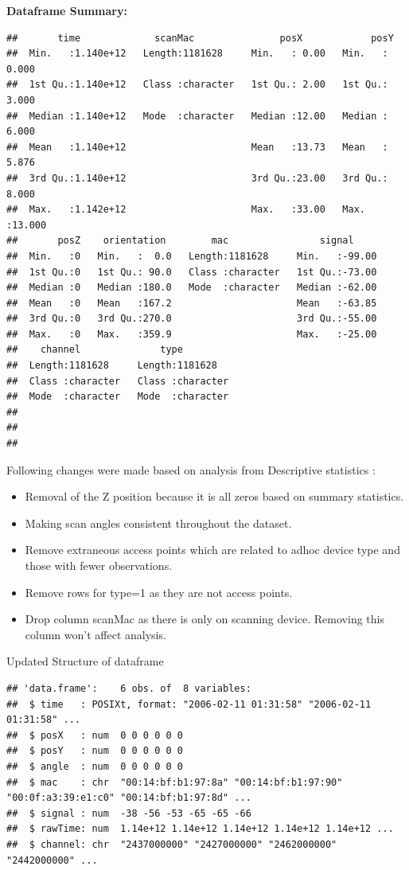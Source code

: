 \documentclass[
]{article}
\providecommand{\tightlist}{%
  \setlength{\itemsep}{0pt}\setlength{\parskip}{0pt}}
\begin{document}
\textbf{Dataframe Summary:}

\begin{verbatim}
##       time             scanMac               posX            posY       
##  Min.   :1.140e+12   Length:1181628     Min.   : 0.00   Min.   : 0.000  
##  1st Qu.:1.140e+12   Class :character   1st Qu.: 2.00   1st Qu.: 3.000  
##  Median :1.140e+12   Mode  :character   Median :12.00   Median : 6.000  
##  Mean   :1.140e+12                      Mean   :13.73   Mean   : 5.876  
##  3rd Qu.:1.140e+12                      3rd Qu.:23.00   3rd Qu.: 8.000  
##  Max.   :1.142e+12                      Max.   :33.00   Max.   :13.000  
##       posZ    orientation        mac                signal      
##  Min.   :0   Min.   :  0.0   Length:1181628     Min.   :-99.00  
##  1st Qu.:0   1st Qu.: 90.0   Class :character   1st Qu.:-73.00  
##  Median :0   Median :180.0   Mode  :character   Median :-62.00  
##  Mean   :0   Mean   :167.2                      Mean   :-63.85  
##  3rd Qu.:0   3rd Qu.:270.0                      3rd Qu.:-55.00  
##  Max.   :0   Max.   :359.9                      Max.   :-25.00  
##    channel              type          
##  Length:1181628     Length:1181628    
##  Class :character   Class :character  
##  Mode  :character   Mode  :character  
##                                       
##                                       
## 
\end{verbatim}

Following changes were made based on analysis from Descriptive
statistics :

\begin{itemize}
\tightlist
\item
  Removal of the Z position because it is all zeros based on summary
  statistics.
\item
  Making scan angles consistent throughout the dataset.
\item
  Remove extraneous access points which are related to adhoc device type
  and those with fewer observations.
\item
  Remove rows for type=1 as they are not access points.
\item
  Drop column scanMac as there is only on scanning device. Removing this
  column won't affect analysis.
\end{itemize}

Updated Structure of dataframe

\begin{verbatim}
## 'data.frame':    6 obs. of  8 variables:
##  $ time   : POSIXt, format: "2006-02-11 01:31:58" "2006-02-11 01:31:58" ...
##  $ posX   : num  0 0 0 0 0 0
##  $ posY   : num  0 0 0 0 0 0
##  $ angle  : num  0 0 0 0 0 0
##  $ mac    : chr  "00:14:bf:b1:97:8a" "00:14:bf:b1:97:90" "00:0f:a3:39:e1:c0" "00:14:bf:b1:97:8d" ...
##  $ signal : num  -38 -56 -53 -65 -65 -66
##  $ rawTime: num  1.14e+12 1.14e+12 1.14e+12 1.14e+12 1.14e+12 ...
##  $ channel: chr  "2437000000" "2427000000" "2462000000" "2442000000" ...
\end{verbatim}
\end{document}
